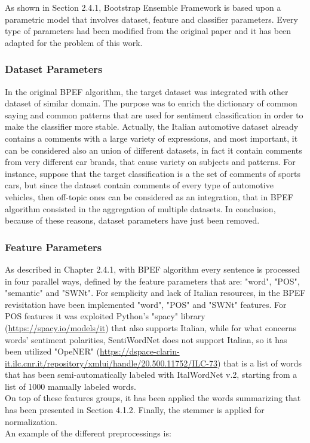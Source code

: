 As shown in Section 2.4.1, Bootstrap Ensemble Framework is based upon a parametric model that involves dataset, feature and classifier parameters. Every type of parameters had been modified from the original paper and it has been adapted for the problem of this work.

\subsubsection{Dataset Parameters}

In the original BPEF algorithm, the target dataset was integrated with other dataset of similar domain. The purpose was to enrich the dictionary of common saying and common patterns that are used for sentiment classification in order to make the classifier more stable. Actually, the Italian automotive dataset already contains a comments with a large variety of expressions, and most important, it can be considered also an union of different datasets, in fact it contain comments from very different car brands, that cause variety on subjects and patterns. For instance, suppose that the target classification is a the set of comments of sports cars, but since the dataset contain comments of every type of automotive vehicles, then off-topic ones can be considered as an integration, that in BPEF algorithm consisted in the aggregation of multiple datasets. In conclusion, because of these reasons, dataset parameters have just been removed.


\subsubsection{Feature Parameters}

As described in Chapter 2.4.1, with BPEF algorithm every sentence is processed in four parallel ways, defined by the feature parameters that are: "word", "POS", "semantic" and "SWNt". For semplicity and lack of Italian resources, in the BPEF revisitation have been implemented "word", "POS" and "SWNt" features. For POS features it was exploited Python's "spacy" library (\url{https://spacy.io/models/it}) that also supports Italian, while for what  concerns words' sentiment polarities, SentiWordNet does not support Italian, so it has been utilized "OpeNER" (\url{https://dspace-clarin-it.ilc.cnr.it/repository/xmlui/handle/20.500.11752/ILC-73}) that is a list of words that has been semi-automatically labeled with ItalWordNet v.2, starting from a list of 1000 manually labeled words.\\
On top of these features groups, it has been applied the words summarizing that has been presented in Section 4.1.2. Finally, the stemmer is applied for normalization.\\
An example of the different preprocessings is:

